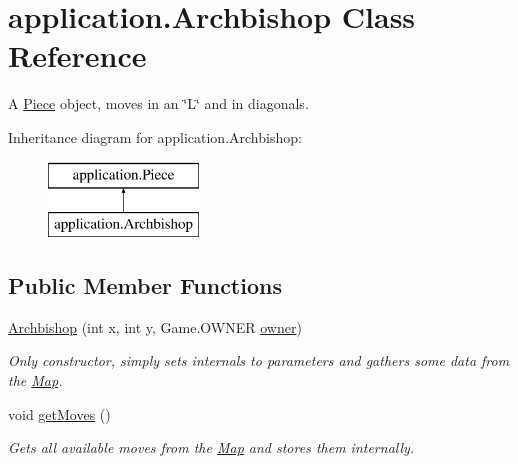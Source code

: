 \hypertarget{classapplication_1_1_archbishop}{\section{application.\+Archbishop Class Reference}
\label{classapplication_1_1_archbishop}
}


A \hyperlink{classapplication_1_1_piece}{Piece} object, moves in an \char`\"{}\+L\char`\"{} and in diagonals.  


Inheritance diagram for application.\+Archbishop\+:\begin{figure}[H]
\begin{center}
\leavevmode
\includegraphics[height=2.000000cm]{classapplication_1_1_archbishop}
\end{center}
\end{figure}
\subsection*{Public Member Functions}
\begin{DoxyCompactItemize}
\item 
\hyperlink{classapplication_1_1_archbishop_a7089f574b3b187b5f9cdbc97985796cd}{Archbishop} (int x, int y, Game.\+O\+W\+N\+E\+R \hyperlink{classapplication_1_1_piece_a724f116bd99a66a6f6bcc8b7b35de131}{owner})
\begin{DoxyCompactList}\small\item\em Only constructor, simply sets internals to parameters and gathers some data from the \hyperlink{classapplication_1_1_map}{Map}. \end{DoxyCompactList}\item 
\hypertarget{classapplication_1_1_archbishop_a9cfee0021cca194c7ca87ad871a34a14}{void \hyperlink{classapplication_1_1_archbishop_a9cfee0021cca194c7ca87ad871a34a14}{get\+Moves} ()}\label{classapplication_1_1_archbishop_a9cfee0021cca194c7ca87ad871a34a14}

\begin{DoxyCompactList}\small\item\em Gets all available moves from the \hyperlink{classapplication_1_1_map}{Map} and stores them internally. \end{DoxyCompactList}\end{DoxyCompactItemize}
